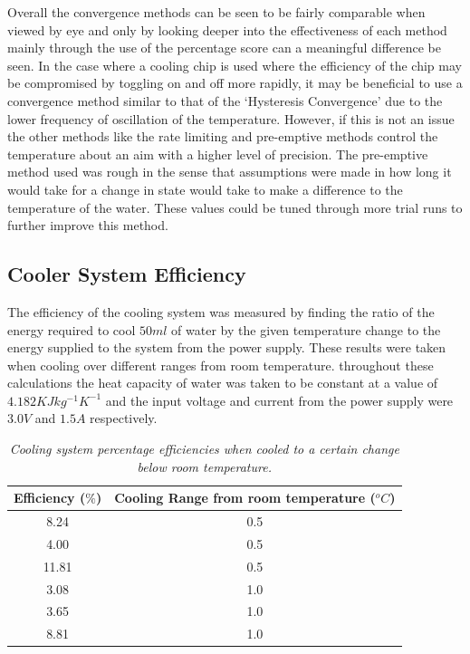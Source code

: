 \documentclass[10pt]{article}
\begin{document}
Overall the convergence methods can be seen to be fairly comparable when viewed by eye and only by looking deeper into the effectiveness of each method mainly through the use of the percentage score can a meaningful difference be seen. In the case where a cooling chip is used where the efficiency of the chip may be compromised by toggling on and off more rapidly, it may be beneficial to use a convergence method similar to that of the `Hysteresis Convergence' due to the lower frequency of oscillation of the temperature. However, if this is not an issue the other methods like the rate limiting and pre-emptive methods control the temperature about an aim with a higher level of precision. The pre-emptive method used was rough in the sense that assumptions were made in how long it would take for a change in state would take to make a difference to the temperature of the water. These values could be tuned through more trial runs to further improve this method.

\subsection*{Cooler System Efficiency}
The efficiency of the cooling system was measured by finding the ratio of the energy required to cool $50ml$ of water by the given temperature change to the energy supplied to the system from the power supply. These results were taken when cooling over different ranges from room temperature. throughout these calculations the heat capacity of water was taken to be constant at a value of $4.182KJkg^{-1}K^{-1}$\cite{heat_cap_val} and the input voltage and current from the power supply were $3.0V$ and $1.5A$ respectively. \\

\begin{table}[h!]
    \centering
    \begin{tabular}{|c|c|}
        \hline
        Efficiency ($\%$) & Cooling Range from room temperature ($^oC$) \\
        \hline
        8.24 & 0.5 \\
        4.00 & 0.5\\
        11.81 & 0.5 \\
        3.08 & 1.0\\
        3.65 & 1.0\\
        8.81 & 1.0\\
        \hline 
    \end{tabular}
    \caption{\it{Cooling system percentage efficiencies when cooled to a certain change below room temperature.}}
    \label{tab:efficiencies}
\end{table}
\end{document}
